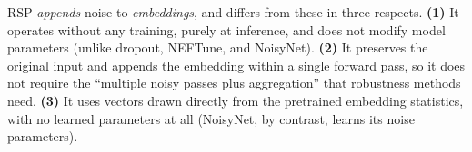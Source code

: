 RSP \textit{appends} noise to \textit{embeddings}, and differs from these in three respects. \textbf{(1)} It operates without any training, purely at inference, and does not modify model parameters (unlike dropout, NEFTune, and NoisyNet). \textbf{(2)} It preserves the original input and appends the embedding within a single forward pass, so it does not require the ``multiple noisy passes plus aggregation'' that robustness methods need. \textbf{(3)} It uses vectors drawn directly from the pretrained embedding statistics, with no learned parameters at all (NoisyNet, by contrast, learns its noise parameters).
